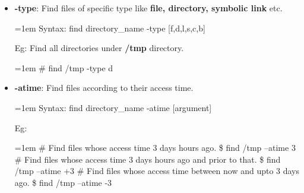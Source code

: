 \begin{flushleft}
\begin{itemize}
\begin{itemize}
			\bigskip
			\bigskip
			
			\item \textbf{-type}: Find files of specific type like \textbf{file, directory, symbolic link} etc.
			\bigskip
			\begin{tcolorbox}[breakable,notitle,boxrule=-0pt,colback=pink,colframe=pink]
				\color{black}
				\font=1em
				Syntax: find directory\_name -type [f,d,l,s,c,b]
				\font=4pt
			\end{tcolorbox}
			\bigskip
			Eg: Find all directories under \textbf{/tmp} directory.
			\bigskip
			\begin{tcolorbox}[breakable,notitle,boxrule=-0pt,colback=black,colframe=black]
				\color{green}
				\font=1em
				\# find /tmp -type d
				\font=4pt
			\end{tcolorbox}		
			
			\bigskip
			\bigskip
			
			\item \textbf{-atime}: Find files according to their access time.
			\bigskip
			\begin{tcolorbox}[breakable,notitle,boxrule=-0pt,colback=pink,colframe=pink]
				\color{black}
				\font=1em
				Syntax: find directory\_name -atime [argument]
				\font=4pt
			\end{tcolorbox}
			\bigskip
			Eg:
			\bigskip
			\begin{tcolorbox}[breakable,notitle,boxrule=-0pt,colback=black,colframe=black]
				\color{yellow}
				\font=1em
				\# Find files whose access time 3 days hours ago.
				\color{green}
				\newline
				\$ find /tmp –atime 3 
				\newline
				\newline				
				\color{yellow}
				\# Find files whose access time 3 days hours ago and prior to that.
				\color{green}
				\newline
				\$ find /tmp –atime +3 
				\newline
				\color{yellow}
				\newline
				\# Find files whose access time between now and upto 3 days ago.
				\color{green}
				\newline
				\$ find /tmp –atime -3 
				\font=4pt
			\end{tcolorbox}		


			\bigskip
			\bigskip
			

\end{itemize}
\end{itemize}
\end{flushleft}
